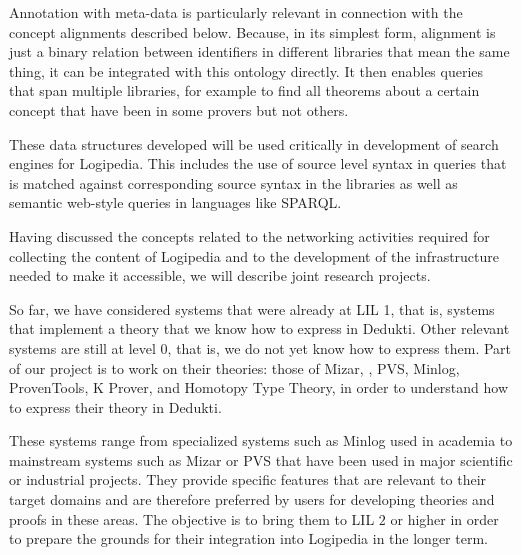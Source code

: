 Annotation with meta-data is particularly relevant in connection with the concept alignments
described below. Because, in its simplest form, alignment is just a
binary relation between identifiers in different libraries that mean
the same thing, it can be integrated with this ontology directly.  It
then enables queries that span multiple libraries, for example to find all
theorems about a certain concept that have been in some provers but not
others.

These data structures developed will be used
critically in development of search engines for Logipedia.  This
includes the use of source level syntax in queries that is matched
against corresponding source syntax in the libraries as well as
semantic web-style queries in languages like SPARQL.


Having discussed the concepts related to the networking activities
required for collecting the content of Logipedia and to the
development of the infrastructure needed to make it accessible, we
will describe joint research projects.

So far, we have considered systems that were already at LIL 1, that
is, systems that implement a theory that we know how to express in
Dedukti.  Other relevant systems are still at level 0, that is, we do
not yet know how to express them. Part of our project is to work on
their theories: those of Mizar, \tlaplus, PVS, Minlog, ProvenTools,
K Prover, and Homotopy Type Theory, in order to understand how
to express their theory in Dedukti.

These systems range from specialized systems such as Minlog
used in academia to mainstream systems such as Mizar or PVS that
have been used in major scientific or industrial projects. They
provide specific features that are relevant to their target domains
and are therefore preferred by users for developing theories and
proofs in these areas.  The objective is to bring them to
LIL $2$ or higher in order to prepare the grounds for their integration
into Logipedia in the longer term.

